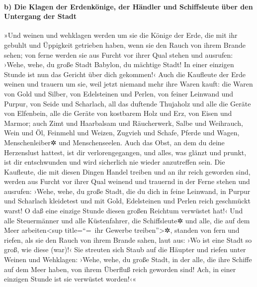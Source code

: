\hypertarget{b-die-klagen-der-erdenkuxf6nige-der-huxe4ndler-und-schiffsleute-uxfcber-den-untergang-der-stadt}{%
\paragraph{b) Die Klagen der Erdenkönige, der Händler und Schiffsleute
über den Untergang der
Stadt}\label{b-die-klagen-der-erdenkuxf6nige-der-huxe4ndler-und-schiffsleute-uxfcber-den-untergang-der-stadt}}

 »Und weinen und wehklagen werden um sie die Könige der
Erde, die mit ihr gebuhlt und Üppigkeit getrieben haben, wenn sie den
Rauch von ihrem Brande sehen;  von ferne werden sie aus
Furcht vor ihrer Qual stehen und ausrufen: ›Wehe, wehe, du große Stadt
Babylon, du mächtige Stadt! In einer einzigen Stunde ist nun das Gericht
über dich gekommen!‹  Auch die Kaufleute der Erde weinen
und trauern um sie, weil jetzt niemand mehr ihre Waren kauft:
 die Waren von Gold und Silber, von Edelsteinen und
Perlen, von feiner Leinwand und Purpur, von Seide und Scharlach, all das
duftende Thujaholz und alle die Geräte von Elfenbein, alle die Geräte
von kostbarem Holz und Erz, von Eisen und Marmor;  auch
Zimt und Haarbalsam und Räucherwerk, Salbe und Weihrauch, Wein und Öl,
Feinmehl und Weizen, Zugvieh und Schafe, Pferde und Wagen,
Menschenleiber✲ und Menschenseelen.  Auch das Obst, an
dem du deine Herzenslust hattest, ist dir verlorengegangen, und alles,
was glänzt und prunkt, ist dir entschwunden und wird sicherlich nie
wieder anzutreffen sein.  Die Kaufleute, die mit diesen
Dingen Handel treiben und an ihr reich geworden sind, werden aus Furcht
vor ihrer Qual weinend und trauernd in der Ferne stehen 
und ausrufen: ›Wehe, wehe, du große Stadt, die du dich in feine
Leinwand, in Purpur und Scharlach kleidetest und mit Gold, Edelsteinen
und Perlen reich geschmückt warst! O daß eine einzige Stunde diesen
großen Reichtum verwüstet hat!‹  Und alle Steuermänner
und alle Küstenfahrer, die Schiffsleute✲ und alle, die auf dem Meer
arbeiten\textless sup title=``=~ihr Gewerbe treiben''\textgreater✲,
standen von fern  und riefen, als sie den Rauch von ihrem
Brande sahen, laut aus: ›Wo ist eine Stadt so groß, wie diese (war)!‹
 Sie streuten sich Staub auf die Häupter und riefen unter
Weinen und Wehklagen: ›Wehe, wehe, du große Stadt, in der alle, die ihre
Schiffe auf dem Meer haben, von ihrem Überfluß reich geworden sind! Ach,
in einer einzigen Stunde ist sie verwüstet worden!‹«

